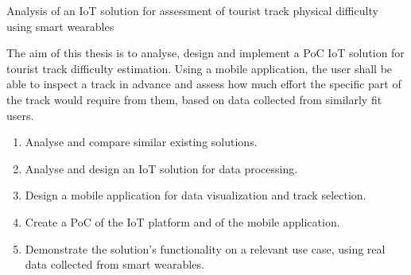 \linebreak
Analysis of an IoT solution for assessment of tourist track physical difficulty using smart wearables

The aim of this thesis is to analyse, design and implement a PoC IoT solution for tourist track difficulty estimation.
Using a mobile application, the user shall be able to inspect a track in advance and assess how much effort the specific part of the track would require from them, based on data collected from similarly fit users.
\begin{enumerate}
    \item Analyse and compare similar existing solutions.
    \item Analyse and design an IoT solution for data processing.
    \item Design a mobile application for data visualization and track selection.
    \item Create a PoC of the IoT platform and of the mobile application.
    \item Demonstrate the solution's functionality on a relevant use case, using real data collected from smart wearables.
\end{enumerate}
